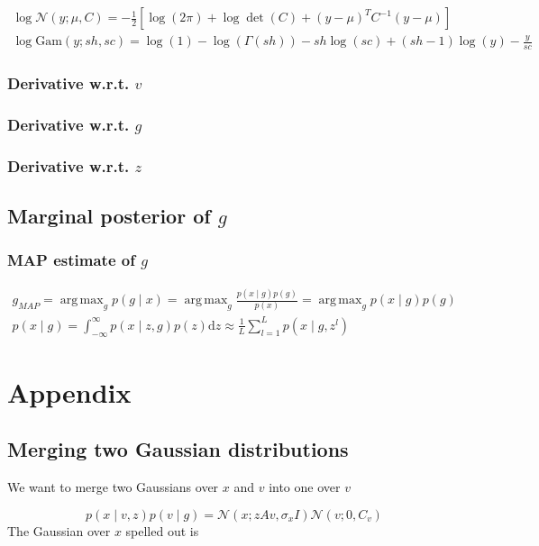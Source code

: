 \documentclass{paper}
\DeclareMathOperator*{\argmax}{arg\,max}
\begin{document}
\begin{eqnarray}
\log  \mathcal{N}(y;\mu,C) = -\frac{1}{2} \left[ \log (2\pi) + \log \det (C) + (y - \mu)^T C^{-1} (y-\mu) \right] \\
\log  \textrm{Gam}(y;sh,sc) = \log(1) - \log(\Gamma(sh)) - sh \log(sc) + (sh-1) \log(y) - \frac{y}{sc}
\end{eqnarray}

\subsubsection{Derivative w.r.t. $v$}
\subsubsection{Derivative w.r.t. $g$}
\subsubsection{Derivative w.r.t. $z$}


\subsection{Marginal posterior of $g$}
\subsubsection{MAP estimate of $g$}

\begin{eqnarray}
g_{MAP} = \argmax_g p(g \mid x) = \argmax_g \frac{p(x \mid g)p(g)}{p(x)} = \argmax_g p(x \mid g)p(g)\\
p(x \mid g) = \int_{-\infty}^{\infty} p(x \mid z,g)p(z)\mathrm{d}z \approx \frac{1}{L} \sum_{l=1}^{L} p(x \mid g,z^l)
\end{eqnarray}


\section*{Appendix}

\subsection{Merging two Gaussian distributions}

We want to merge two Gaussians over $x$ and $v$ into one over $v$

\begin{equation}
p(x \mid v,z) p(v \mid g) = \mathcal{N}(x;zAv,\sigma_x I) \mathcal{N}(v;0,C_v)
\end{equation}
%
The Gaussian over $x$ spelled out is
\end{document}
